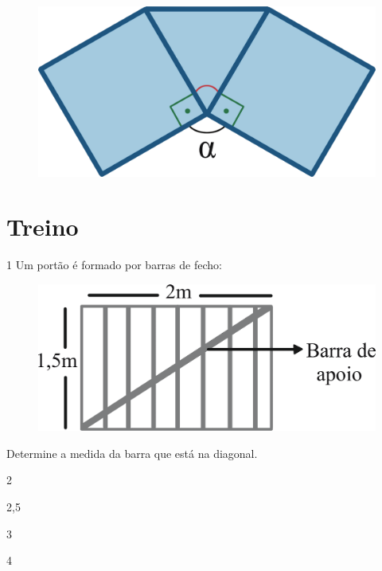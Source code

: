 \begin{figure}[htpb!]
\centering
\includegraphics[width=.5\textwidth]{./ilustras-mat/modulo_11-atividade_10_resposta.png}
\end{figure}

\begin{emptybox}
\end{emptybox}

\pagebreak
\section{Treino}

\num{1} Um portão é formado por barras de fecho:

\begin{figure}[htpb!]
\centering
\includegraphics[width=\textwidth]{./ilustras-mat/modulo_11-treino_1.png}
\end{figure}

Determine a medida da barra que está na diagonal.

\begin{escolha}
  \item 2

  \item 2,5
  
  \item 3
  
  \item 4
\end{escolha}


